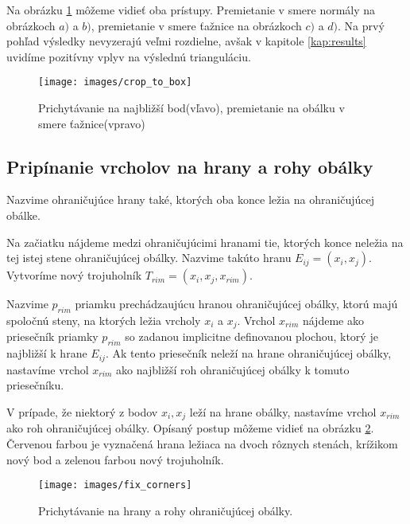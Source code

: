 Na obrázku \ref{obr:crop_to_box} môžeme vidieť oba prístupy. Premietanie v smere normály 
na obrázkoch $a)$ a $b)$, premietanie v smere ťažnice na obrázkoch $c)$ a $d)$. Na prvý pohľad 
výsledky nevyzerajú veľmi rozdielne, avšak v kapitole \ref{kap:results} uvidíme pozitívny vplyv 
na výslednú trianguláciu. 
        
\begin{figure}
    \centerline{\texttt{[image: images/crop\_to\_box]}}
    \caption[Orezávanie na ohraničujúcu obálku]
    {Prichytávanie na najbližší bod(vľavo), premietanie na obálku v smere ťažnice(vpravo)}
    \label{obr:crop_to_box}
\end{figure}

\subsection{Pripínanie vrcholov na hrany a rohy obálky}

Nazvime ohraničujúce hrany také, ktorých oba konce ležia na ohraničujúcej obálke.
                
Na začiatku nájdeme medzi ohraničujúcimi hranami tie, ktorých konce neležia
na tej istej stene ohraničujúcej obálky. 
Nazvime takúto hranu $E_{ij} = (x_i, x_j)$. Vytvoríme nový trojuholník 
$T_{rim} = (x_i, x_j, x_{rim})$. 

Nazvime $p_{rim}$ priamku prechádzaujúcu 
hranou ohraničujúcej obálky, ktorú majú spoločnú steny, na ktorých ležia 
vrcholy $x_i$ a $x_j$. Vrchol $x_{rim}$ nájdeme ako priesečník priamky $p_{rim}$ 
so zadanou implicitne definovanou plochou, ktorý je najbližší k hrane $E_{ij}$. 
Ak tento priesečník neleží na hrane ohraničujúcej obálky, nastavíme vrchol $x_{rim}$ 
ako najbližší roh ohraničujúcej obálky k tomuto priesečníku.

V prípade, že niektorý z bodov $x_i, x_j$ leží na hrane obálky, nastavíme vrchol
$x_{rim}$ ako roh ohraničujúcej obálky.
Opísaný postup môžeme vidieť na obrázku \ref{obr:fix_corners}. Červenou farbou je vyznačená 
hrana ležiaca na dvoch rôznych stenách, krížikom nový bod a zelenou
farbou nový trojuholník.

\begin{figure}
    \centerline{\texttt{[image: images/fix\_corners]}}
    \caption[Prichytávanie na hrany a rohy ohraničujúcej obálky]
    {Prichytávanie na hrany a rohy ohraničujúcej obálky.}
    \label{obr:fix_corners}
\end{figure}

